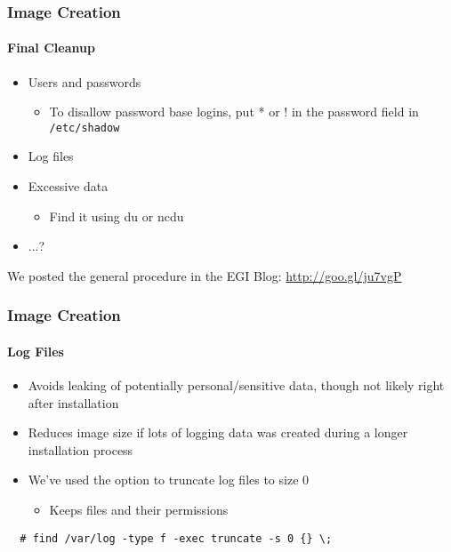 \begin{frame}
\frametitle{Image Creation}
\framesubtitle{Final Cleanup}
\begin{itemize}
\item Users and passwords
\begin{itemize}
\item To disallow password base logins, put * or ! in the password field in \texttt{/etc/shadow}
\end{itemize}
\item Log files
\item Excessive data
  \begin{itemize}
  \item Find it using du or ncdu
  \end{itemize}
\item ...?
\end{itemize}
\vfill\hfill\scriptsize{We posted the general procedure in the EGI Blog: \url{http://goo.gl/ju7vgP}}
\end{frame}

\begin{frame}[fragile]
\frametitle{Image Creation}
\framesubtitle{Log Files}
\begin{itemize}
\item Avoids leaking of potentially personal/sensitive data, though
  not likely right after installation
\item Reduces image size if lots of logging data was created during a
  longer installation process
\item We've used the option to truncate log files to size 0
  \begin{itemize}
  \item Keeps files and their permissions
  \end{itemize}
\end{itemize}
\begin{lstlisting}
  # find /var/log -type f -exec truncate -s 0 {} \;
\end{lstlisting}
\end{frame}

